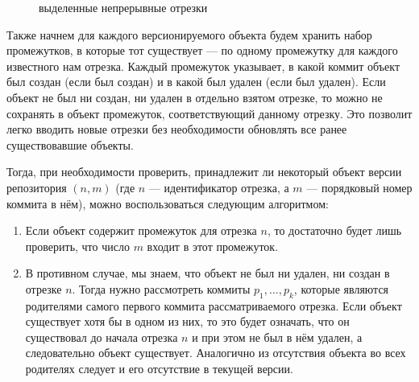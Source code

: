 \begin{figure}[H]
    \centering
    \caption{выделенные непрерывные отрезки}
\end{figure}

Также начнем для каждого версионируемого объекта будем хранить набор промежутков, в которые тот существует — по одному промежутку для каждого известного нам отрезка. Каждый промежуток указывает, в какой коммит объект был создан (если был создан) и в какой был удален (если был удален). Если объект не был ни создан, ни удален в отдельно взятом отрезке, то можно не сохранять в объект промежуток, соответствующий данному отрезку. Это позволит легко вводить новые отрезки без необходимости обновлять все ранее существовавшие объекты.

Тогда, при необходимости проверить, принадлежит ли некоторый объект версии репозитория $(n, m)$ (где $n$ — идентификатор отрезка, а $m$ — порядковый номер коммита в нём), можно воспользоваться следующим алгоритмом:
\begin{enumerate}
    \item Если объект содержит промежуток для отрезка $n$, то достаточно будет лишь проверить, что число $m$ входит в этот промежуток.
    \item В противном случае, мы знаем, что объект не был ни удален, ни создан в отрезке $n$. Тогда нужно рассмотреть коммиты $p_1, …, p_k$, которые являются родителями самого первого коммита рассматриваемого отрезка. Если объект существует хотя бы в одном из них, то это будет означать, что он существовал до начала отрезка $n$ и при этом не был в нём удален, а следовательно объект существует. Аналогично из отсутствия объекта во всех родителях следует и его отсутствие в текущей версии.
\end{enumerate}

